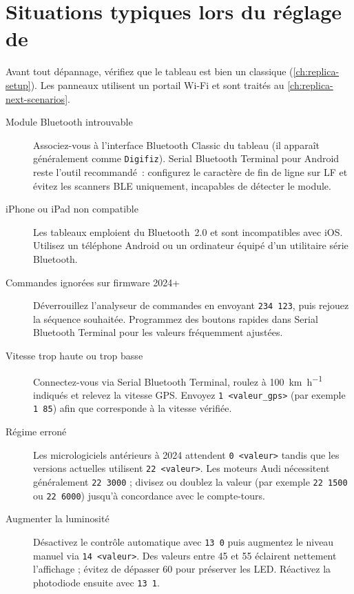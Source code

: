 \chapter{Situations typiques lors du réglage de \ReplicaGenOne{}}\label{ch:replica-scenarios}

Avant tout dépannage, vérifiez que le tableau est bien un \ReplicaGenOne{} classique (\autoref{ch:replica-setup}). Les panneaux \ReplicaNextLong{} utilisent un portail Wi-Fi et sont traités au \autoref{ch:replica-next-scenarios}.

\begin{description}
    \item[Module Bluetooth introuvable] Associez-vous à l'interface Bluetooth Classic du tableau (il apparaît généralement comme \texttt{Digifiz}). Serial Bluetooth Terminal pour Android reste l'outil recommandé~: configurez le caractère de fin de ligne sur LF et évitez les scanners BLE uniquement, incapables de détecter le module.
    \item[iPhone ou iPad non compatible] Les tableaux \ReplicaGenOneShort{} emploient du Bluetooth~2.0 et sont incompatibles avec iOS. Utilisez un téléphone Android ou un ordinateur équipé d'un utilitaire série Bluetooth.
    \item[Commandes ignorées sur firmware 2024+] Déverrouillez l'analyseur de commandes en envoyant \verb|234 123|, puis rejouez la séquence souhaitée. Programmez des boutons rapides dans Serial Bluetooth Terminal pour les valeurs fréquemment ajustées.
    \item[Vitesse trop haute ou trop basse] Connectez-vous via Serial Bluetooth Terminal, roulez à \SI{100}{\kilo\metre\per\hour} indiqués et relevez la vitesse GPS. Envoyez \verb|1 <valeur_gps>| (par exemple \verb|1 85|) afin que  corresponde à la vitesse vérifiée.
    \item[Régime erroné] Les micrologiciels antérieurs à 2024 attendent \verb|0 <valeur>| tandis que les versions actuelles utilisent \verb|22 <valeur>|. Les moteurs Audi nécessitent généralement \verb|22 3000| ; divisez ou doublez la valeur (par exemple \verb|22 1500| ou \verb|22 6000|) jusqu'à concordance avec le compte-tours.
    \item[Augmenter la luminosité] Désactivez le contrôle automatique avec \verb|13 0| puis augmentez le niveau manuel via \verb|14 <valeur>|. Des valeurs entre 45 et 55 éclairent nettement l'affichage ; évitez de dépasser 60 pour préserver les LED. Réactivez la photodiode ensuite avec \verb|13 1|.

\end{description}
